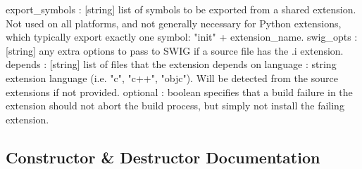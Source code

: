 \begin{DoxyVerb}
  export_symbols : [string]
    list of symbols to be exported from a shared extension.  Not
    used on all platforms, and not generally necessary for Python
    extensions, which typically export exactly one symbol: "init" +
    extension_name.
  swig_opts : [string]
    any extra options to pass to SWIG if a source file has the .i
    extension.
  depends : [string]
    list of files that the extension depends on
  language : string
    extension language (i.e. "c", "c++", "objc"). Will be detected
    from the source extensions if not provided.
  optional : boolean
    specifies that a build failure in the extension should not abort the
    build process, but simply not install the failing extension.
\end{DoxyVerb}
 

\subsection{Constructor \& Destructor Documentation}
\mbox{\label{classsetuptools_1_1__distutils_1_1extension_1_1Extension_a13788a24f343dcc4b445c1792a2b6f54}} 
